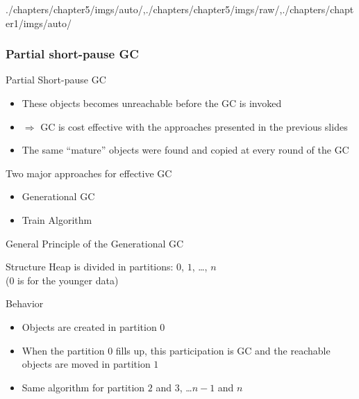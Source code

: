 \begin{graphicspathcontext}{{./chapters/chapter5/imgs/auto/},{./chapters/chapter5/imgs/raw/},{./chapters/chapter1/imgs/auto/}}
\begin{bibunit}[apalike]
\subsubsection{Partial short-pause GC}
\subsubsectiontableofcontentslide
\resetsectionsintoc

\begin{frame}{Partial Short-pause GC}
	\vspace{.25cm}
	\begin{itemize}
		\item These objects becomes unreachable before the GC is invoked
		\item $\Rightarrow$ GC is cost effective with the approaches presented in the previous slides
	\end{itemize}
	\vspace{.25cm}
	\begin{itemize}
		\item The same ``mature'' objects were found and copied at every round of the GC
	\end{itemize}
	\vspace{.25cm}
	\begin{block}{Two major approaches for effective GC}
		\begin{itemize}
			\item Generational GC
			\item Train Algorithm
		\end{itemize}
	\end{block}
\end{frame}

\begin{frame}{{General Principle} of the Generational GC}
	\begin{block}{Structure}
		Heap is divided in partitions: $0$, $1$, \dots, $n$ \\
		($0$ is for the younger data)
	\end{block}
	\vspace{.5cm}
	\begin{block}{Behavior}
		\begin{itemize}
			\item Objects are created in partition $0$
			\item When the partition $0$ fills up, this participation is GC and the reachable objects are moved in partition $1$
			\item Same algorithm for partition $2$ and $3$, \dots $n-1$ and $n$
		\end{itemize}
	\end{block}
\end{frame}


\end{bibunit}
\end{graphicspathcontext}
